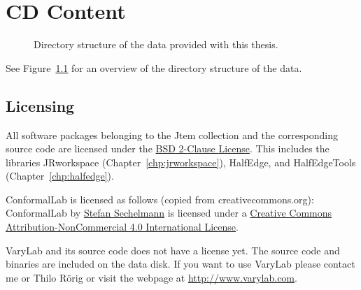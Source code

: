 \documentclass[Thesis]{subfiles}
\begin{document}
\chapter{CD Content}
\label{chp:cd_content}

\begin{figure}
\vspace{0.2cm}
\caption{Directory structure of the data provided with this thesis.}
\label{fig:dir_structure}
\end{figure}

See Figure~\ref{fig:dir_structure} for an overview of the directory structure of the data.

\section{Licensing}
All software packages belonging to the {\sc Jtem} collection and the corresponding source code are licensed under the \href{http://opensource.org/licenses/bsd-license.php}{{BSD} 2-{C}lause {L}icense}. This includes the libraries {\sc JRworkspace} (Chapter~\ref{chp:jrworkspace}), {\sc HalfEdge}, and {\sc HalfEdgeTools} (Chapter~\ref{chp:halfedge}).

{\sc ConformalLab} is licensed as follows (copied from creativecommons.org): {\sc ConformalLab} by \href{http://www.sechel.de}{Stefan Sechelmann} is licensed under a \href{http://creativecommons.org/licenses/by-nc/4.0/}{Creative Commons Attribution-NonCommercial 4.0 International License}.

{\sc VaryLab} and its source code does not have a license yet. The source code and binaries are included on the data disk. If you want to use {\sc VaryLab} please contact me or Thilo R\"orig or visit the webpage at \url{http://www.varylab.com}.

\subfilebibliography
\end{document}
